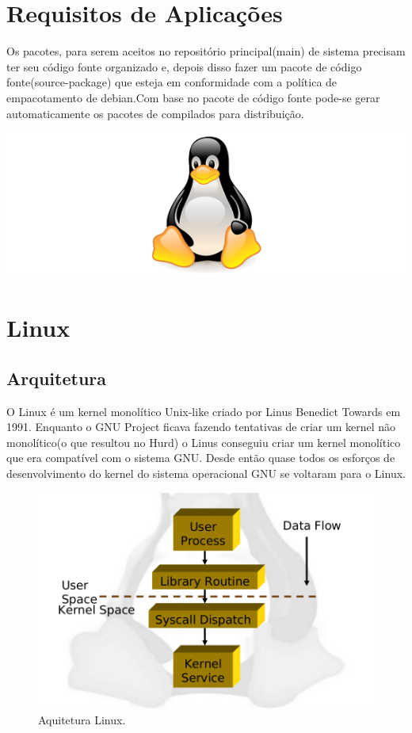 \documentclass[conference]{IEEEtran}
\begin{document}
\section{Requisitos de Aplicações}\label{sec:req}
Os pacotes, para serem aceitos no repositório principal(main) de sistema precisam ter seu código fonte organizado e, depois disso fazer um pacote de código fonte(source-package) que esteja em conformidade com a política de empacotamento de debian.\cite{DebiankPackaging}Com base no pacote de código fonte pode-se gerar automaticamente os pacotes de compilados para distribuição.


\includegraphics[scale = 0.4]{Tux.png}\\
\section{Linux}\label{sec:linux}

\subsection{Arquitetura}\label{sec:LinuxArq}
O Linux é um kernel monolítico Unix-like criado por Linus Benedict Towards em 1991.\cite{LinuxHistory} Enquanto o GNU Project ficava fazendo tentativas de criar um kernel não monolítico(o que resultou no Hurd) o Linus conseguiu criar um kernel monolítico que era compatível com o sistema GNU. Desde então quase todos os esforços de desenvolvimento do kernel do sistema operacional GNU se voltaram para o Linux.\\

\begin{figure}[htb!]
	\centering
	\includegraphics[scale=0.25]{arqtLinux.png}
	\caption{Aquitetura Linux.}
	\label{fig:SisAqrLinux}
\end{figure}
\end{document}

